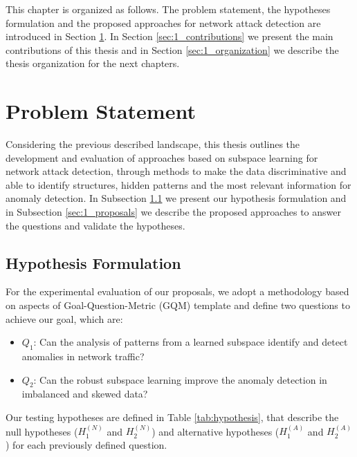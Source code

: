 This chapter is organized as follows. The problem statement, the hypotheses formulation and the proposed approaches for network attack detection are introduced in Section \ref{sec:1_problems}. In Section \ref{sec:1_contributions} we present the main contributions of this thesis and in Section \ref{sec:1_organization} we describe the thesis organization for the next chapters.

\section{Problem Statement}
\label{sec:1_problems}

Considering the previous described landscape, this thesis outlines the development and evaluation of approaches based on subspace learning for network attack detection, through methods to make the data discriminative and able to identify structures, hidden patterns and the most relevant information for anomaly detection. In Subsection \ref{sec:1_Hypothesis} we present our hypothesis formulation and in Subsection \ref{sec:1_proposals} we describe the proposed approaches to answer the questions and validate the hypotheses.

\subsection{Hypothesis Formulation}
\label{sec:1_Hypothesis}

For the experimental evaluation of our proposals, we adopt a methodology based on aspects of Goal-Question-Metric (GQM) template \citep{Basili1994} and define two questions to achieve our goal, which are:

\begin{itemize}
	\item $Q_1$: Can the analysis of patterns from a learned subspace identify and detect anomalies in network traffic?
	\item $Q_2$: Can the robust subspace learning improve the anomaly detection in imbalanced and skewed data?
\end{itemize}

Our testing hypotheses are defined in Table \ref{tab:hypothesis}, that describe the null hypotheses ($H_1^{(N)}$ and $H_2^{(N)}$) and alternative hypotheses ($H_1^{(A)}$ and $H_2^{(A)}$) for each previously defined question. 

